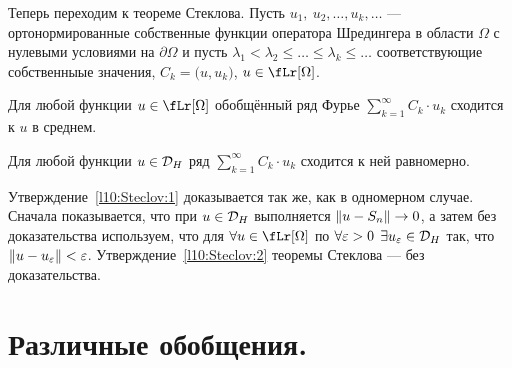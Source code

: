 %

Теперь переходим к теореме Стеклова. Пусть $u_1,\ u_2,\ldots,u_k,\ldots$ --- ортонормированные собственные функции оператора Шредингера в области $\Omega$ с нулевыми условиями на $\partial\Omega$ и пусть $\lambda_1<\lambda_2\leqslant\ldots\leqslant\lambda_k\leqslant\ldots$ соответствующие собственныые значения, $C_k=\big(u,u_k\big)$, $u\in\fLr[\Omega]$. 
\begin{_teor}[Стеклова]\hfill
	\begin{enumerate1}
		\item\label{l10:Steclov:1} Для любой функции $u\in\fLr[\Omega]$ обобщённый ряд Фурье $\displaystyle\sum\limits_{k=1}^{\infty}C_k\cdot u_k$ сходится к $u$ в среднем.
		\item\label{l10:Steclov:2} Для любой функции $u\in\mathcal{D}_{H}$ ряд  $\displaystyle\sum\limits_{k=1}^{\infty}C_k\cdot u_k$ сходится к ней равномерно.
	\end{enumerate1}
\end{_teor}
Утверждение~\ref{l10:Steclov:1} доказывается так же, как в одномерном случае. Сначала показывается, что при $u\in\mathcal{D}_H$ выполняется $\left\|u-S_n\right\|\to0$, а затем без доказательства используем, что для $\forall u\?\in\fLr[\Omega]$ по $\forall\varepsilon>0$ $\exists u_{\varepsilon}\in\mathcal{D}_H$ так, что $\left\|u-u_{\varepsilon}\right\|<\varepsilon$. Утверждение~\ref{l10:Steclov:2} теоремы Стеклова --- без доказательства.

\section{Различные обобщения.}
\label{lecture10section2}
